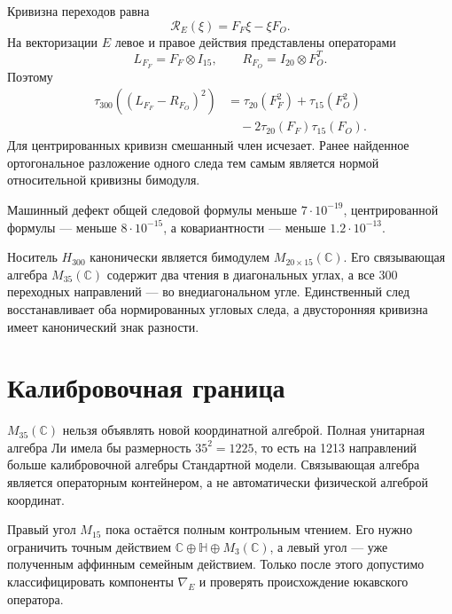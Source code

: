 Кривизна переходов равна
\begin{equation}
 \mathcal R_E(\xi)=F_F\xi-\xi F_O.
 \label{eq:v5-morita-relative-curvature}
\end{equation}
На векторизации $E$ левое и правое действия представлены операторами
\begin{equation}
 L_{F_F}=F_F\otimes I_{15},
 \qquad
 R_{F_O}=I_{20}\otimes F_O^T.
\end{equation}
Поэтому
\begin{align}
 \tau_{300}\!\left((L_{F_F}-R_{F_O})^2\right)
 &=\tau_{20}(F_F^2)+\tau_{15}(F_O^2)\nonumber\\
 &\quad-2\tau_{20}(F_F)\tau_{15}(F_O).
 \label{eq:v5-morita-relative-trace}
\end{align}
Для центрированных кривизн смешанный член исчезает. Ранее найденное
ортогональное разложение одного следа тем самым является нормой
относительной кривизны бимодуля.

Машинный дефект общей следовой формулы меньше $7\cdot10^{-19}$,
центрированной формулы --- меньше $8\cdot10^{-15}$, а ковариантности ---
меньше $1.2\cdot10^{-13}$.

\begin{theorem}
Носитель $H_{300}$ канонически является бимодулем
$M_{20\times15}(\mathbb C)$. Его связывающая алгебра $M_{35}(\mathbb C)$
содержит два чтения в диагональных углах, а все 300 переходных направлений
--- во внедиагональном угле. Единственный след восстанавливает оба
нормированных угловых следа, а двусторонняя кривизна имеет канонический знак
разности.
\end{theorem}

\section{Калибровочная граница}

$M_{35}(\mathbb C)$ нельзя объявлять новой координатной алгеброй. Полная
унитарная алгебра Ли имела бы размерность $35^2=1225$, то есть на 1213
направлений больше калибровочной алгебры Стандартной модели. Связывающая
алгебра является операторным контейнером, а не автоматически физической
алгеброй координат.

Правый угол $M_{15}$ пока остаётся полным контрольным чтением. Его нужно
ограничить точным действием
$\mathbb C\oplus\mathbb H\oplus M_3(\mathbb C)$, а левый угол --- уже
полученным аффинным семейным действием. Только после этого допустимо
классифицировать компоненты $\nabla_E$ и проверять происхождение юкавского
оператора.

